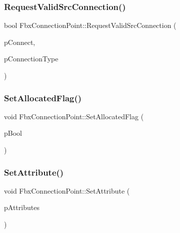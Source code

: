 \subsubsection{\texorpdfstring{Request\+Valid\+Src\+Connection()}{RequestValidSrcConnection()}}
{\footnotesize\ttfamily bool Fbx\+Connection\+Point\+::\+Request\+Valid\+Src\+Connection (\begin{DoxyParamCaption}\item[{\hyperlink{class_fbx_connection_point}{Fbx\+Connection\+Point} $\ast$}]{p\+Connect,  }\item[{\hyperlink{class_fbx_connection_a3df448a5db356652ab99fd2be2553749}{Fbx\+Connection\+::\+E\+Type}}]{p\+Connection\+Type }\end{DoxyParamCaption})}

\mbox{\label{class_fbx_connection_point_ac026ad6f5ce4a258fe83007e17b0860e}} 
\subsubsection{\texorpdfstring{Set\+Allocated\+Flag()}{SetAllocatedFlag()}}
{\footnotesize\ttfamily void Fbx\+Connection\+Point\+::\+Set\+Allocated\+Flag (\begin{DoxyParamCaption}\item[{bool}]{p\+Bool }\end{DoxyParamCaption})}

\mbox{\label{class_fbx_connection_point_a06b3412adfa8dc6ef96fa65214f6f843}} 
\subsubsection{\texorpdfstring{Set\+Attribute()}{SetAttribute()}}
{\footnotesize\ttfamily void Fbx\+Connection\+Point\+::\+Set\+Attribute (\begin{DoxyParamCaption}\item[{int}]{p\+Attributes }\end{DoxyParamCaption})}

\mbox{\label{class_fbx_connection_point_a0d2010007894dd64e5399b4f473740a7}} 
